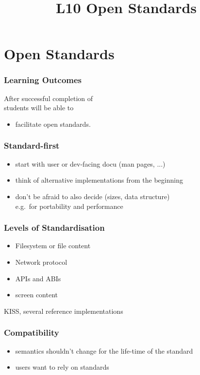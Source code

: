 

\title{L10 Open Standards}



\section{Open Standards}

\begin{frame}
	\frametitle{Learning Outcomes}
	After successful completion of \inserttitle \\
	students will be able to

	\begin{itemize}
	\item facilitate open standards.
	\end{itemize}
\end{frame}

\begin{frame}
	\frametitle{Standard-first}

	\begin{itemize}[<+-| alert@+>]
	\item start with user or dev-facing docu (man pages, ...)
	\item think of alternative implementations from the beginning
	\item don't be afraid to also decide (sizes, data structure) \\ e.g.\ for portability and performance
	\end{itemize}
\end{frame}

\begin{frame}
	\frametitle{Levels of Standardisation}

	\begin{itemize}[<+-| alert@+>]
	\item Filesystem or file content
	\item Network protocol
	\item APIs and ABIs
	\item screen content
	\end{itemize}
	
	\pause[\thebeamerpauses]  %

	KISS, several reference implementations
\end{frame}

\begin{frame}
	\frametitle{Compatibility}

	\begin{itemize}[<+-| alert@+>]
	\item semantics shouldn't change for the life-time of the standard
	\item users want to rely on standards
	\end{itemize}
\end{frame}

